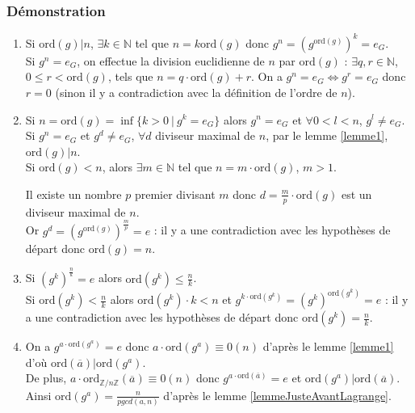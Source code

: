 \documentclass[a4paper,10pt]{book} %
\newcommand{\N}{\mathbb{N}}
\newcommand{\Z}{\mathbb{Z}}
\newcommand{\tq}{~|~}
\newcommand{\ord}{\mathrm{ord}}
\begin{document}
\subsubsection{Démonstration}
\begin{enumerate}
\item Si $\ord(g)|n$, $\exists k\in \N$ tel que $n=k\ord(g)$ donc $g^n=(g^{\ord(g)})^k=e_G$.\\

Si $g^n=e_G$, on effectue la division euclidienne de $n$ par $\ord(g)$ : $\exists q,r\in \N$, $0\leq r<\ord(g)$, tels que $n=q\cdot\ord(g)+r$. On a $g^n=e_G\Leftrightarrow g^r=e_G$ donc $r=0$ (sinon il y a contradiction avec la définition de l'ordre de $n$).\\

\item Si $n=\ord(g)=\inf\{k>0 \tq g^k=e_G\}$ alors $g^n=e_G$ et $\forall 0<l<n$, $g^l\neq e_G$.\\

Si $g^n=e_G$ et $g^d\neq e_G$, $\forall d$ diviseur maximal de $n$, par le lemme \ref{lemme1}, $\ord(g)|n$.\\

Si $\ord(g)<n$, alors $\exists m\in \N$ tel que $n=m\cdot \ord(g)$, $m>1$. 

Il existe un nombre $p$ premier divisant $m$ donc $d=\frac{m}{p}\cdot \ord(g)$ est un diviseur maximal de $n$.\\

Or $g^d=(g^{\ord(g)})^{\frac{m}{p}}=e$ : il y a une contradiction avec les hypothèses de départ donc $\ord(g)=n$.\\

\item Si $(g^k)^{\frac{n}{k}}=e$ alors $\ord(g^k)\leq \frac{n}{k}$.\\
Si $\ord(g^k)<\frac{n}{k}$ alors $\ord (g^k)\cdot k<n$ et $g^{k\cdot \ord(g^k)}=(g^k)^{\ord(g^k)}=e$ : il y a une contradiction avec les hypothèses de départ donc $\ord(g^k)=\frac{n}{k}$.\\

\item On a $g^{a\cdot\ord(g^a)}=e$ donc $a\cdot\ord(g^a)\equiv0(n)$ d'après le lemme \ref{lemme1} d'où $\ord(\overline{a})|\ord(g^a)$.\\

De plus, $a\cdot \ord_{\Z/n\Z}(\overline{a})\equiv 0(n)$ donc $g^{a\cdot \ord(\overline{a})}=e$ et $\ord(g^a)|\ord(\overline{a})$.\\ 

Ainsi $\ord(g^a)=\frac{n}{pgcd(a,n)}$ d'après le lemme \ref{lemmeJusteAvantLagrange}.
\end{enumerate}
\end{document}

